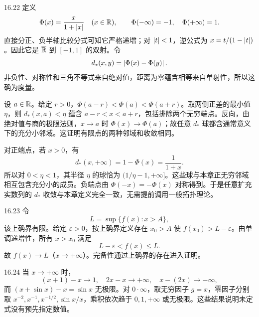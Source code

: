 \begin{solution}{16.22}
定义
\[
 \Phi(x)=\frac{x}{1+\left|x\right|}\quad(x\in\mathbb{R}),\qquad
 \Phi(-\infty)=-1,\quad\Phi(+\infty)=1.
\]
直接分正、负半轴比较分式可知它严格递增；对 \(\left|t\right|<1\)，逆公式为 \(x=t/(1-\left|t\right|)\)。因此它是 \(\overline{\mathbb{R}}\) 到 \([-1,1]\) 的双射。令
\[
 d_*(x,y)=\left|\Phi(x)-\Phi(y)\right|.
\]
非负性、对称性和三角不等式来自绝对值，距离为零蕴含相等来自单射性，所以这确为度量。

设 \(a\in\mathbb{R}\)。给定 \(r>0\)，\(\Phi(a-r)<\Phi(a)<\Phi(a+r)\)。取两侧正差的最小值 \(\eta\)，则 \(d_*(x,a)<\eta\) 蕴含 \(a-r<x<a+r\)，包括排除两个无穷端点。反向，由绝对值与商的极限法则，\(x\to a\) 时 \(\Phi(x)\to\Phi(a)\)；故任意 \(d_*\) 球都含通常意义下的充分小邻域。这证明有限点的两种邻域和收敛相同。

对正端点，若 \(x>0\)，有
\[
 d_*(x,+\infty)=1-\Phi(x)=\frac1{1+x}.
\]
所以对 \(0<\eta<1\)，其半径 \(\eta\) 的球恰为 \((1/\eta-1,+\infty]\)。这些球与本章正无穷邻域相互包含充分小的成员。负端点由 \(\Phi(-x)=-\Phi(x)\) 对称得到。于是任意扩充实数列的 \(d_*\) 收敛与本章定义完全一致，无需提前调用一般拓扑理论。
\end{solution}

\begin{solution}{16.23}
令
\[
 L=\sup\{f(x):x>A\},
\]
该上确界有限。给定 \(\varepsilon>0\)，按上确界定义存在 \(x_0>A\) 使 \(f(x_0)>L-\varepsilon\)。由单调递增性，所有 \(x>x_0\) 满足
\[
 L-\varepsilon<f(x)\le L.
\]
故 \(f(x)\to L\)（\(x\to+\infty\)）。完备性通过上确界的存在进入证明。
\end{solution}

\begin{solution}{16.24}
当 \(x\to+\infty\) 时，
\[
 (x+1)-x\to1,\quad 2x-x\to+\infty,\quad
 x-(2x)\to-\infty,
\]
而 \((x+\sin x)-x=\sin x\) 无极限。对 \(0\cdot\infty\)，取无穷因子 \(g=x\)，零因子分别取 \(x^{-2},x^{-1},x^{-1/2},\sin x/x\)，乘积依次趋于 \(0,1,+\infty\) 或无极限。这些结果说明未定式没有预先指定数值。
\end{solution}
